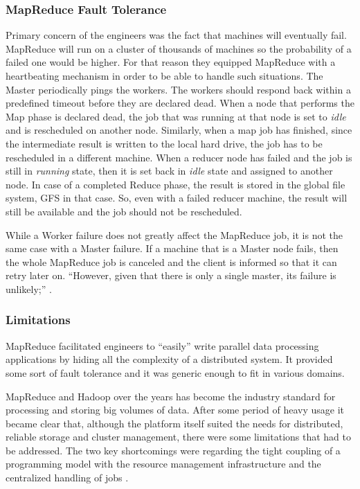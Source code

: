 \subsubsection{MapReduce Fault Tolerance}
Primary concern of the engineers was the fact
that machines will eventually fail. MapReduce will run on a cluster of
thousands of machines so the probability of a failed one would be
higher. For that reason they equipped MapReduce with a heartbeating
mechanism in order to be able to handle such situations.
The Master periodically pings the workers. The workers should respond back
within a predefined timeout before they are declared dead. When a node
that performs the Map phase is declared dead, the job that was
running at that node is set to \emph{idle} and is rescheduled on
another node. Similarly, when a map job has finished, since the
intermediate result is written to the local hard drive, the job has to
be rescheduled in a different machine. When a reducer node has failed
and the job is still in \emph{running} state, then it is set back in
\emph{idle} state and assigned to another node. In case of a completed
Reduce phase, the result is stored in the global file system, GFS in
that case. So, even with a failed reducer machine, the result will
still be available and the job should not be rescheduled.

While a Worker failure does not greatly affect the MapReduce job, it
is not the same case with a Master failure. If a machine that is a
Master node fails, then the whole MapReduce job is canceled and the
client is informed so that it can retry later on. ``However, given
that there is only a single master, its failure is unlikely;''
\cite{Dean:2004:MSD:1251254.1251264}.

\subsubsection{Limitations}
\label{sssec:mapreduce_limitations}
MapReduce facilitated engineers to ``easily'' write parallel data
processing applications by hiding all the complexity of a distributed
system. It provided some sort of fault tolerance and it was generic
enough to fit in various domains.

MapReduce and Hadoop over the years has become the industry standard
for processing and storing big volumes of data. After some period of
heavy usage it became clear that, although the platform itself suited
the needs for distributed, reliable storage and cluster management,
there were some limitations that had to be addressed. The two key
shortcomings were regarding the tight coupling of a programming model
with the resource management infrastructure and the centralized
handling of jobs \cite{Vavilapalli:2013:AHY:2523616.2523633, 6680946}.


